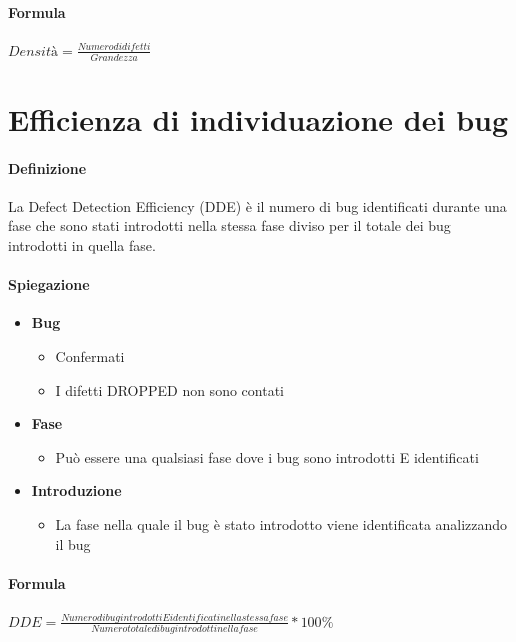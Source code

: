 \documentclass[11pt,a4paper]{book}
\begin{document}
\paragraph{Formula}
\begin{center}
	$Densità = \frac{Numero di difetti}{Grandezza}$
\end{center}

\section{Efficienza di individuazione dei bug}
\paragraph{Definizione}
La Defect Detection Efficiency (DDE) è il numero di bug identificati durante una fase che sono stati introdotti nella stessa fase diviso per il totale dei bug introdotti in quella fase.

\paragraph{Spiegazione}
\begin{itemize}
	\item \textbf{Bug}
		\begin{itemize}
			\item Confermati
			\item I difetti DROPPED non sono contati
		\end{itemize}
	\item \textbf{Fase}
		\begin{itemize}
			\item Può essere una qualsiasi fase dove i bug sono introdotti E identificati
		\end{itemize}
	\item \textbf{Introduzione}
		\begin{itemize}
			\item La fase nella quale il bug è stato introdotto viene identificata analizzando il bug
		\end{itemize}
\end{itemize}

\paragraph{Formula}
\begin{center}
	$DDE = \frac{Numero di bug introdotti E identificati nella stessa fase}{Numero totale di bug introdotti nella fase} * 100 \% $
\end{center}
\end{document}
